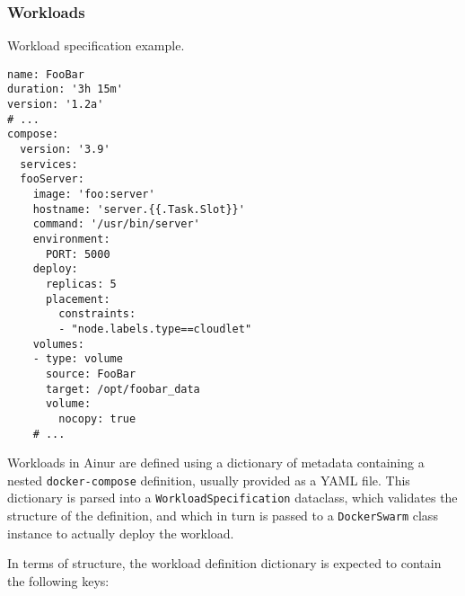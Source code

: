 \subsubsection{Workloads}\label{sec:workload}

\begin{listing}[tb]
\caption{Workload specification example.}\label{lst:compose}
\begin{verbatim}
name: FooBar
duration: '3h 15m'
version: '1.2a'
# ...
compose:
  version: '3.9'
  services:
  fooServer:
    image: 'foo:server'
    hostname: 'server.{{.Task.Slot}}'
    command: '/usr/bin/server'
    environment:
      PORT: 5000
    deploy:
      replicas: 5
      placement:
        constraints:
        - "node.labels.type==cloudlet"
    volumes:
    - type: volume
      source: FooBar
      target: /opt/foobar_data
      volume:
        nocopy: true
    # ...
\end{verbatim}
\end{listing}


Workloads in Ainur are defined using a dictionary of metadata containing a nested \verb|docker-compose| definition, usually provided as a YAML file.
This dictionary is parsed into a \texttt{WorkloadSpecification} dataclass, which validates the structure of the definition, and which in turn is passed to a \texttt{DockerSwarm} class instance to actually deploy the workload.

In terms of structure, the workload definition dictionary is expected to contain the following keys:

